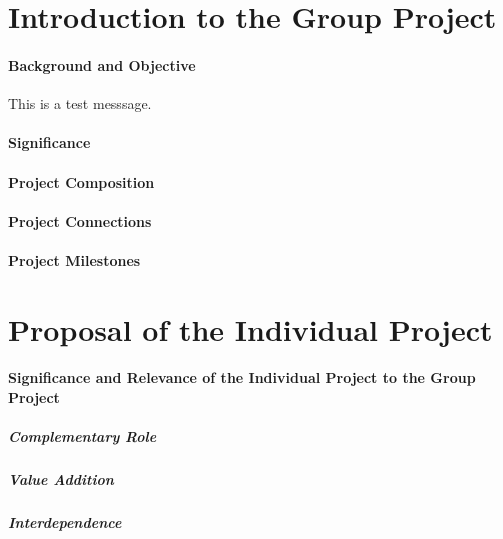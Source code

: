 \documentclass[12pt]{article}
\newenvironment{subs}{\adjustwidth{3em}{0pt}}{\endadjustwidth}
\begin{document}


\newpage
\tableofcontents
{}
\setcounter{page}{2}
\newpage

\setcounter{page}{1}

\part{Introduction to the Group Project}
\setcounter{section}{1}
\subsection{Background and Objective}
\begin{subs}
This is a test messsage.
\end{subs}
\subsection{Significance}
\subsection{Project Composition}
\subsection{Project Connections}
\subsection{Project Milestones}

\part{Proposal of the Individual Project}
\setcounter{section}{2}
\setcounter{subsection}{0}
\subsection{Significance and Relevance of the Individual Project to the Group Project}
\subsubsection{Complementary Role}
\subsubsection{Value Addition}
\subsubsection{Interdependence}
\end{document}
